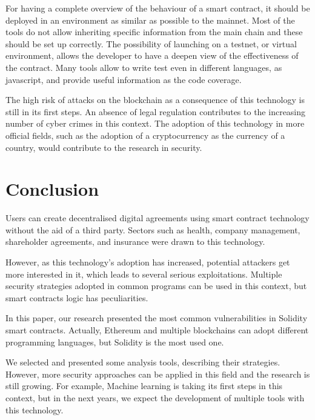 \documentclass[a4paper,sigconf, language=french,
language=german, language=spanish, language=english]{acmart}
\begin{document}
For having a complete overview of the behaviour of a smart contract, it should be deployed in an environment as similar as possible to the mainnet. Most of the tools do not allow inheriting specific information from the main chain and these should be set up correctly. 
The possibility of launching on a testnet, or virtual environment, allows the developer to have a deepen view of the effectiveness of the contract. Many tools allow to write test even in different languages, as javascript, and provide useful information as the code coverage.

The high risk of attacks on the blockchain as a consequence of this technology is still in its first steps. An absence of legal regulation contributes to the increasing number of cyber crimes in this context. The adoption of this technology in more official fields, such as the adoption of a cryptocurrency as the currency of a country, would contribute to the research in security.

\section{Conclusion}
\label{Conclusion}
Users can create decentralised digital agreements using smart contract technology without the aid of a third party.
Sectors such as health, company management, shareholder agreements, and insurance were drawn to this technology.

However, as this technology's adoption has increased, potential attackers get more interested in it, which leads to several serious exploitations. 
Multiple security strategies adopted in common programs can be used in this context, but smart contracts logic has peculiarities. 

In this paper, our research presented the most common vulnerabilities in Solidity smart contracts. Actually, Ethereum and multiple blockchains can adopt different programming languages, but Solidity is the most used one.

We selected and presented some analysis tools, describing their strategies. However, more security approaches can be applied in this field and the research is still growing. For example, Machine learning is taking its first steps in this context, but in the next years, we expect the development of multiple tools with this technology. 




\end{document}
